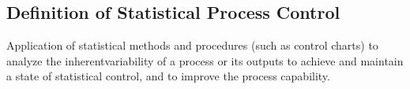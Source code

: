 \documentclass[11pt]{article} %
\begin{document}
	
\subsection{Definition of Statistical Process Control}
Application of statistical methods and procedures (such as control charts) 
to analyze the inherentvariability of a process or its outputs to achieve and maintain 
a state of statistical control, and to improve the process capability. 

%	
%	
%	
%	
%	
%	
\end{document}
